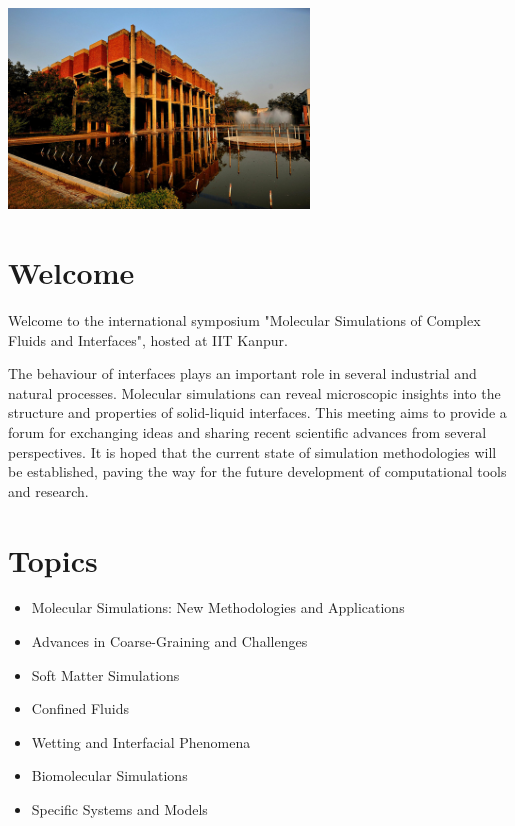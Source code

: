 
\vspace{-1em}

\begin{center}
\includegraphics[width=0.6\textwidth]{images/lib.jpg}
\end{center}

\section{Welcome}

\vspace{-1em}

Welcome to the international symposium "Molecular Simulations of Complex Fluids and Interfaces", hosted at IIT Kanpur.

The behaviour of interfaces plays an important role in several industrial and natural processes. Molecular simulations can reveal microscopic insights into the structure and properties of solid-liquid interfaces. This meeting aims to provide a forum for exchanging ideas and sharing recent scientific advances from several perspectives. It is hoped that the current state of simulation methodologies will be established, paving the way for the future development of computational tools and research.

\vspace{-2em}

\section{Topics}

\vspace{-1em}

\begin{itemize}
  \itemsep-1em 
  \item Molecular Simulations: New Methodologies and Applications
  \item Advances in Coarse-Graining and Challenges
  \item Soft Matter Simulations
  \item Confined Fluids
  \item Wetting and Interfacial Phenomena
  \item Biomolecular Simulations
  \item Specific Systems and Models
\end{itemize}

